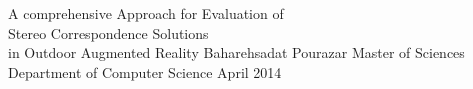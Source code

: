\documentclass[dvips,letterpaper,12pt]{report}
\begin{document}

\thesistitle
	{A comprehensive Approach for Evaluation of \\ 
	Stereo Correspondence Solutions \\
	in Outdoor Augmented Reality}
	{Baharehsadat Pourazar}
	{Master of Sciences}
	{Department of Computer Science}
	{April 2014}
















\end{document}
